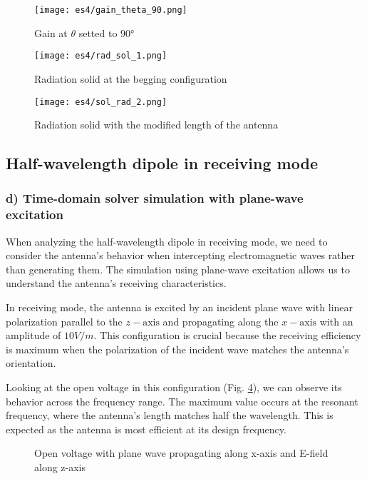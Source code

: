 \documentclass{article}
\begin{document}
\begin{figure}[h]
\centering
\texttt{[image: es4/gain\_theta\_90.png]}
\caption{Gain at $\theta$ setted to $90°$}
\label{fig:gain_theta_90}
\end{figure}


\begin{figure}[h]
\centering
\texttt{[image: es4/rad\_sol\_1.png]}
\caption{Radiation solid at the begging configuration}
\label{fig:radiation solid}
\end{figure}

\begin{figure}[h]
\centering
\texttt{[image: es4/sol\_rad\_2.png]}
\caption{Radiation solid with the modified length of the antenna}
\label{fig:radiation solid_1}
\end{figure}





\subsection{Half-wavelength dipole in receiving mode}

\subsubsection{d) Time-domain solver simulation with plane-wave excitation}
When analyzing the half-wavelength dipole in receiving mode, we need to consider the antenna's behavior when intercepting electromagnetic waves rather than generating them. The simulation using plane-wave excitation allows us to understand the antenna's receiving characteristics.

In receiving mode, the antenna is excited by an incident plane wave with linear polarization parallel to the $z-\text{axis}$ and propagating along the $x-\text{axis}$ with an amplitude of $10 V/m$. This configuration is crucial because the receiving efficiency is maximum when the polarization of the incident wave matches the antenna's orientation. 

Looking at the open voltage in this configuration (Fig. \ref{fig:open_voltage_1}), we can observe its behavior across the frequency range. The maximum value occurs at the resonant frequency, where the antenna's length matches half the wavelength. This is expected as the antenna is most efficient at its design frequency.

\begin{figure}[h]
\centering
\caption{Open voltage with plane wave propagating along x-axis and E-field along z-axis}
\label{fig:open_voltage_1}
\end{figure}
\end{document}
